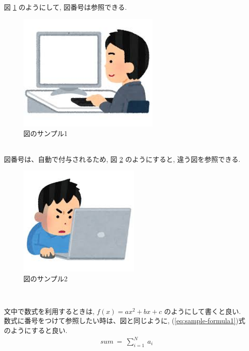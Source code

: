 \documentclass[a4paper,11pt]{jsarticle}
\begin{document}
  \twocolumn %
  \maketitle %

    図 \ref{fig:sample-image1} のようにして, 図番号は参照できる. \\
    \begin{figure}[htbp]
      \centering
      \includegraphics[width=70mm]{sample-image1.png}
      \caption{図のサンプル1} %
      \label{fig:sample-image1} %
    \end{figure}\\

    図番号は、自動で付与されるため, 図 \ref{fig:sample-image2} のようにすると, 違う図を参照できる. \\
    \begin{figure}[htbp]
      \centering
      \includegraphics[width=60mm]{sample-image2.png}
      \caption{図のサンプル2} 
      \label{fig:sample-image2} 
    \end{figure}\\

    \par
  
    文中で数式を利用するときは, $ f(x) = ax^{2} + bx + c $ のようにして書くと良い. \\
    数式に番号をつけて参照したい時は、図と同じように, (\ref{eq:sample-formula1})式 のようにすると良い.
    \begin{align}
      sum \ = \ \sum_{i=1}^{N} \ a_{i}
      \label{eq:sample-formula1}
    \end{align}\\
\end{document}
